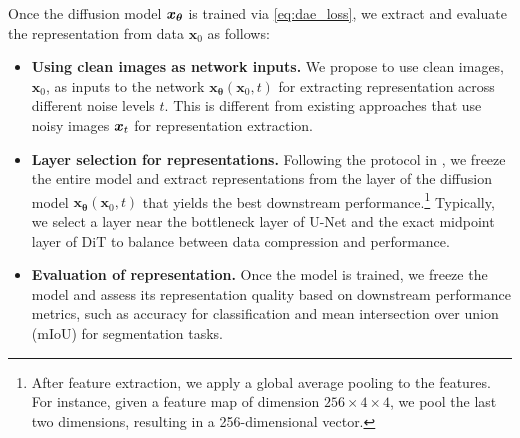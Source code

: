 Once the diffusion model $\bm x_{\bm \theta}$ is trained via \eqref{eq:dae_loss}, we extract and evaluate the representation from data $\bm x_0$ as follows:
\begin{itemize}[leftmargin=*]
    \item \textbf{Using clean images as network inputs.}  We propose to use clean images, $\bm x_0$, as inputs to the network $\bm x_{\bm \theta}(\bm x_0,t)$ for extracting representation across different noise levels $t$. This is different from existing approaches \citep{xiang2023denoising, baranchuk2021label, tang2023emergent} that use noisy images $\bm x_t$ for representation extraction.
    \item \textbf{Layer selection for representations.} Following the protocol in \citep{xiang2023denoising}, we freeze the entire model and extract representations from the layer of the diffusion model $\bm x_{\bm \theta}(\bm x_0,t)$ that yields the best downstream performance.\footnote{After feature extraction, we apply a global average pooling to the features. For instance, given a feature map of dimension $256 \times 4 \times 4$, we pool the last two dimensions, resulting in a 256-dimensional vector.} Typically, we select a layer near the bottleneck layer of U-Net and the exact midpoint layer of DiT to balance between data compression and performance.
    \item \textbf{Evaluation of representation.} Once the model is trained, we freeze the model and assess its representation quality based on downstream performance metrics, such as accuracy for classification and mean intersection over union (mIoU) for segmentation tasks.
\end{itemize}


